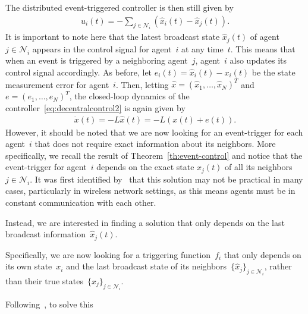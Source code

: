 \documentclass{autart}
\newtheorem{problem}[theorem]{Problem}
\newcommand{\integernonnegative}{\mathbb{Z}_{\ge 0}}
\newcommand{\GG}{{\mathcal{G}}}
\newcommand{\NN}{{\mathcal{N}}}
\newcommand{\commgraph}{\GG_\text{comm}}
\renewcommand{\hat}{\widehat}
\newcommand{\longthmtitle}[1]{\mbox{}\textup{\textbf{(#1)}}}
\begin{document}
The distributed event-triggered controller is then still given by
\begin{align}\label{eq:decentralcontrol2}
  u_i(t) = - \sum_{j \in \NN_i} (\hat{x}_i(t) - \hat{x}_j(t) ) .
\end{align}
It is important to note here that the latest broadcast state
$\hat{x}_j(t)$ of agent $j \in \NN_i$ appears in the control signal
for agent~$i$ at any time~$t$. This means that when an event is
triggered by a neighboring agent~$j$, agent~$i$ also updates its
control signal accordingly.  As before, let
$e_i(t) = \hat{x}_i(t) - x_i(t)$ be the state measurement error for
agent~$i$. Then, letting $\hat{x} = (\hat{x}_1, \dots, \hat{x}_N)^T$
and $e = (e_1, \dots, e_N)^T$, the closed-loop dynamics of the
controller~\eqref{eq:decentralcontrol2} is again given by
\begin{align}\label{eq:decentraldynamics2}
  \dot{x}(t) = - L \hat{x}(t) = - L ( x(t) + e(t) ).
\end{align}
However, it should be noted that we are now looking for an
event-trigger for each agent~$i$ that does not require exact
information about its neighbors. More specifically, we recall the
result of Theorem~\ref{th:event-control} and notice that the
event-trigger for agent~$i$ depends on the exact state $x_j(t)$ of all
its neighbors $j \in \NN_i$. It was first identified
by~\cite{EK-XW-NH:10} that this solution may not be practical in many
cases, particularly in wireless network settings, as this means agents
must be in constant communication with each other.  {Instead, we are
interested in finding a solution that only depends on the last
broadcast information~$\hat{x}_j(t)$.
%

Specifically, we are now looking for a triggering function~$f_i$ that
only depends on its own state~$x_i$ and the last broadcast state of
its neighbors~$\{\hat{x}_j\}_{j \in \NN_i}$, rather than their true
states~$\{x_j\}_{j \in \NN_i}$.}
Following~\citep{CN-JC:14-acc,EG-YC-HY-PA-DC:13}, to solve this
\end{document}
